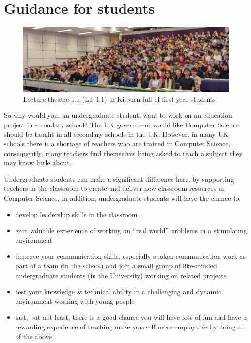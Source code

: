 \documentclass[
  12pt,
]{book}
\providecommand{\tightlist}{%
  \setlength{\itemsep}{0pt}\setlength{\parskip}{0pt}}
\begin{document}
\hypertarget{guidance-for-students}{%
\section{Guidance for students}\label{guidance-for-students}}

\begin{figure}

{\centering \includegraphics[width=0.98\linewidth]{images/studentspanorama} 

}

\caption{Lecture theatre 1.1 (LT 1.1) in Kilburn full of first year students}\label{fig:unnamed-chunk-8}
\end{figure}

So why would you, an undergraduate student, want to work on an education project in secondary school? The UK government would like Computer Science should be taught in all secondary schools in the UK. \citep{afterthereboot} However, in many UK schools there is a shortage of teachers who are trained in Computer Science, consequently, many teachers find themselves being asked to teach a subject they may know little about. \citep{shutdownrestart}

Undergraduate students can make a significant difference here, by supporting teachers in the classroom to create and deliver new classroom resources in Computer Science. \citep{computinged} In addition, undergraduate students will have the chance to:

\begin{itemize}
\tightlist
\item
  develop leadership skills in the classroom
\item
  gain valuable experience of working on ``real world'' problems in a stimulating environment
\item
  improve your communication skills, especially spoken communication
  work as part of a team (in the school) and join a small group of like-minded undergraduate students (in the University) working on related projects
\item
  test your knowledge \& technical ability in a challenging and dynamic environment working with young people
\item
  last, but not least, there is a good chance you will have lots of fun and have a rewarding experience of teaching
  make yourself more employable by doing all of the above
\end{itemize}
\end{document}
